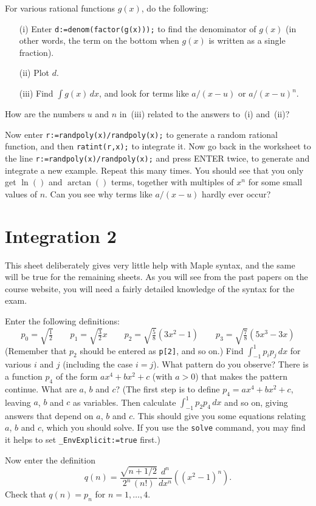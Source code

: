 \documentclass[a4paper,10pt]{amsbook}
\numberwithin{example}{chapter}
\begin{document}
\begin{exercise}
 For various rational functions $g(x)$, do the following:
 \begin{itemize}
  \item[(i)] Enter \verb~d:=denom(factor(g(x)));~ to find
   the denominator of $g(x)$ (in other words, the term on
   the bottom when $g(x)$ is written as a single fraction).
  \item[(ii)] Plot $d$.
  \item[(iii)] Find $\int g(x)\,dx$, and look for terms like
   $a/(x-u)$ or $a/(x-u)^n$. 
 \end{itemize}
 How are the numbers $u$ and $n$ in~(iii) related to the
 answers to~(i) and~(ii)?
 
 Now enter \verb~r:=randpoly(x)/randpoly(x);~ to generate a
 random rational function, and then \verb~ratint(r,x);~ to
 integrate it.  Now go back in the worksheet to the line
 \verb~r:=randpoly(x)/randpoly(x);~ and press ENTER twice,
 to generate and integrate a new example.  Repeat this many
 times.  You should see that you only get $\ln()$ and
 $\arctan()$ terms, together with multiples of $x^n$ for
 some small values of $n$.  Can you see why terms like
 $a/(x-u)$ hardly ever occur?
\end{exercise}


\chapter{Integration 2}


This sheet deliberately gives very little help with Maple syntax, and
the same will be true for the remaining sheets.  As you will see from
the past papers on the course website, you will need a fairly detailed
knowledge of the syntax for the exam.

\begin{exercise}\label{ex-legendre}
 Enter the following definitions:
 \[
  p_0 = \sqrt{\tfrac{1}{2}}            \hspace{2em}
  p_1 = \sqrt{\tfrac{3}{2}} x          \hspace{2em}
  p_2 = \sqrt{\tfrac{5}{8}}(3x^2 - 1)  \hspace{2em}
  p_3 = \sqrt{\tfrac{7}{8}}(5x^3 - 3x)
 \]
 (Remember that $p_2$ should be entered as
 \verb~p[2]~, and so on.)  Find
 $\int_{-1}^1p_ip_j\,dx$ for various $i$ and $j$
 (including the case $i=j$).  What pattern do you observe?
 There is a function $p_4$ of the form $ax^4+bx^2+c$
 (with $a>0$) that makes the pattern continue.  What are
 $a$, $b$ and $c$?  (The first step is to define
 $p_4=ax^4+bx^2+c$, leaving $a$, $b$ and $c$ as
 variables.  Then calculate $\int_{-1}^1p_2p_4\, dx$
 and so on, giving answers that depend on $a$, $b$ and $c$.
 This should give you some equations relating $a$, $b$ and
 $c$, which you should solve.  If you use the \verb~solve~
 command, you may find it helps to set
 \verb~_EnvExplicit:=true~ first.)

 Now enter the definition
 \[ q(n) =
     \frac{\sqrt{n+1/2}}{2^n\,(n!)}
      \frac{d^n}{dx^n}\left((x^2-1)^n\right).
 \]
 Check that $q(n)=p_n$ for $n=1,\ldots,4$.
\end{exercise}
\end{document}
